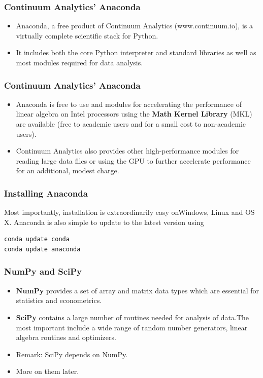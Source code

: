\documentclass[MASTER.tex]{subfiles}
\begin{document}
\begin{frame}
\frametitle{Continuum Analytics’ Anaconda}
\large
\begin{itemize}
\item Anaconda, a free product of Continuum Analytics (www.continuum.io), is a virtually complete scientific
stack for Python. 
\item It includes both the core Python interpreter and standard libraries as well as most
modules required for data analysis. 

\end{itemize}
\end{frame}
\begin{frame}
\frametitle{Continuum Analytics’ Anaconda}
\large
	\begin{itemize}
\item Anaconda is free to use and modules for accelerating the performance
of linear algebra on Intel processors using the \textbf{Math Kernel Library} (MKL) are available (free to
academic users and for a small cost to non-academic users). 
\item Continuum Analytics also provides other
high-performance modules for reading large data files or using the GPU to further accelerate performance
for an additional, modest charge. 
	\end{itemize}

\end{frame}
\begin{frame}[fragile]
\frametitle{Installing Anaconda}
Most importantly, installation is extraordinarily easy onWindows, Linux
and OS X. Anaconda is also simple to update to the latest version using
\begin{framed}
\begin{verbatim}
conda update conda
conda update anaconda
\end{verbatim}
\end{framed}
\end{frame}
\begin{frame}
\frametitle{NumPy and SciPy}

\begin{itemize}
\item \textbf{NumPy} provides a set of array and matrix data types which are essential for statistics and econometrics.

\item \textbf{SciPy} contains a large number of routines needed for analysis of data.The most important include a wide
range of random number generators, linear algebra routines and optimizers. 

\item Remark: SciPy depends on NumPy.

\item More on them later.
\end{itemize}
\end{frame}
\end{document}
